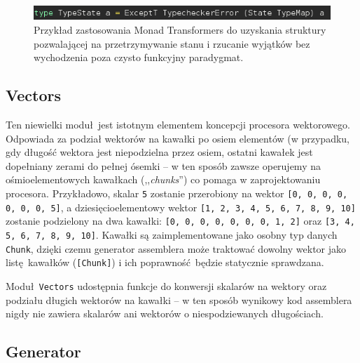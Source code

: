 \begin{figure}
  \begin{center}
    \includegraphics[scale=0.5]{images/type-state.png}
    \caption{Przykład zastosowania Monad Transformers do uzyskania struktury pozwalającej na przetrzymywanie stanu i rzucanie wyjątków bez wychodzenia poza czysto funkcyjny paradygmat.}
    \label{fig:type-state}
  \end{center}
\end{figure}

\subsection{Vectors}

Ten niewielki moduł jest istotnym elementem koncepcji procesora wektorowego. Odpowiada za podział wektorów na kawałki po osiem elementów (w przypadku, gdy długość wektora jest niepodzielna przez osiem, ostatni kawałek jest dopełniany zerami do pełnej ósemki -- w ten sposób zawsze operujemy na ośmioelementowych kawałkach (,,\textit{chunks}'') co pomaga w zaprojektowaniu procesora. Przykładowo, skalar \texttt{5} zostanie przerobiony na wektor \texttt{[0, 0, 0, 0, 0, 0, 0, 5]}, a dziesięcioelementowy wektor \texttt{[1, 2, 3, 4, 5, 6, 7, 8, 9, 10]} zostanie podzielony na dwa kawałki: \texttt{[0, 0, 0, 0, 0, 0, 0, 1, 2]} oraz \texttt{[3, 4, 5, 6, 7, 8, 9, 10]}. Kawałki są zaimplementowane jako osobny typ danych \texttt{Chunk}, dzięki czemu generator assemblera może traktować dowolny wektor jako listę kawałków (\texttt{[Chunk]}) i ich poprawność będzie statycznie sprawdzana.

Moduł \texttt{Vectors} udostępnia funkcje do konwersji skalarów na wektory oraz podziału długich wektorów na kawałki -- w ten sposób wynikowy kod assemblera nigdy nie zawiera skalarów ani wektorów o niespodziewanych długościach.


\subsection{Generator}

